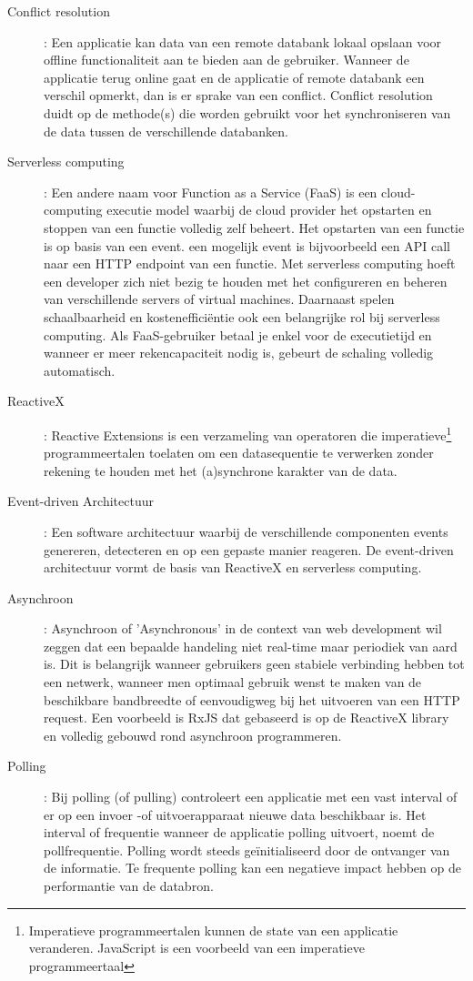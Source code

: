 \begin{description}
\item[Conflict resolution]: Een applicatie kan data van een remote databank lokaal opslaan voor offline functionaliteit aan te bieden aan de gebruiker. Wanneer de applicatie terug online gaat en de applicatie of remote databank een verschil opmerkt, dan is er sprake van een conflict. Conflict resolution duidt op de methode(s) die worden gebruikt voor het synchroniseren van de data tussen de verschillende databanken.
\item[Serverless computing]: Een andere naam voor Function as a Service (FaaS) is een cloud-computing executie model waarbij de cloud provider het opstarten en stoppen van een functie volledig zelf beheert. Het opstarten van een functie is op basis van een event. een mogelijk event is bijvoorbeeld een API call naar een HTTP endpoint van een functie. Met serverless computing hoeft een developer zich niet bezig te houden met het configureren en beheren van verschillende servers of virtual machines. Daarnaast spelen schaalbaarheid en kosteneffici\"entie ook een belangrijke rol bij serverless computing. Als FaaS-gebruiker betaal je enkel voor de executietijd en wanneer er meer rekencapaciteit nodig is, gebeurt de schaling volledig automatisch.
\item[ReactiveX]: Reactive Extensions is een verzameling van operatoren die imperatieve\footnote{Imperatieve programmeertalen kunnen de state van een applicatie veranderen. JavaScript is een voorbeeld van een imperatieve programmeertaal} programmeertalen toelaten om een datasequentie te verwerken zonder rekening te houden met het (a)synchrone karakter van de data.
\item[Event-driven Architectuur]: Een software architectuur waarbij de verschillende componenten events genereren, detecteren en op een gepaste manier reageren. De event-driven architectuur vormt de basis van ReactiveX en serverless computing.
\item[Asynchroon]: Asynchroon of 'Asynchronous' in de context van web development wil zeggen dat een bepaalde handeling niet real-time maar periodiek van aard is. Dit is belangrijk wanneer gebruikers geen stabiele verbinding hebben tot een netwerk, wanneer men optimaal gebruik wenst te maken van de beschikbare bandbreedte of eenvoudigweg bij het uitvoeren van een HTTP request. Een voorbeeld is RxJS dat gebaseerd is op de ReactiveX library en volledig gebouwd rond asynchroon programmeren.
\item[Polling]: Bij polling (of pulling) controleert een applicatie met een vast interval of er op een invoer -of uitvoerapparaat nieuwe data beschikbaar is. Het interval of frequentie wanneer de applicatie polling uitvoert, noemt de pollfrequentie. Polling wordt steeds ge\"initialiseerd door de ontvanger van de informatie. Te frequente polling kan een negatieve impact hebben op de performantie van de databron.

\end{description}
